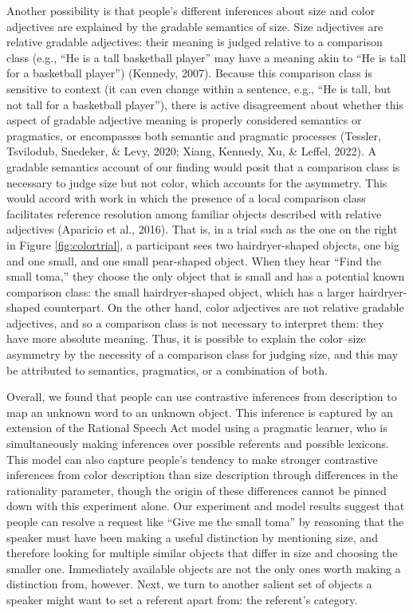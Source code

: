 \documentclass[
  english,
  man,floatsintext]{apa6}
\begin{document}
Another possibility is that people's different inferences about size and color adjectives are explained by the gradable semantics of size. Size adjectives are relative gradable adjectives: their meaning is judged relative to a comparison class (e.g., ``He is a tall basketball player'' may have a meaning akin to ``He is tall for a basketball player'') (Kennedy, 2007). Because this comparison class is sensitive to context (it can even change within a sentence, e.g., ``He is tall, but not tall for a basketball player''), there is active disagreement about whether this aspect of gradable adjective meaning is properly considered semantics or pragmatics, or encompasses both semantic and pragmatic processes (Tessler, Tsvilodub, Snedeker, \& Levy, 2020; Xiang, Kennedy, Xu, \& Leffel, 2022). A gradable semantics account of our finding would posit that a comparison class is necessary to judge size but not color, which accounts for the asymmetry. This would accord with work in which the presence of a local comparison class facilitates reference resolution among familiar objects described with relative adjectives (Aparicio et al., 2016). That is, in a trial such as the one on the right in Figure \ref{fig:colortrial}, a participant sees two hairdryer-shaped objects, one big and one small, and one small pear-shaped object. When they hear ``Find the small toma,'' they choose the only object that is small and has a potential known comparison class: the small hairdryer-shaped object, which has a larger hairdryer-shaped counterpart. On the other hand, color adjectives are not relative gradable adjectives, and so a comparison class is not necessary to interpret them: they have more absolute meaning. Thus, it is possible to explain the color--size asymmetry by the necessity of a comparison class for judging size, and this may be attributed to semantics, pragmatics, or a combination of both.

Overall, we found that people can use contrastive inferences from description to map an unknown word to an unknown object. This inference is captured by an extension of the Rational Speech Act model using a pragmatic learner, who is simultaneously making inferences over possible referents and possible lexicons. This model can also capture people's tendency to make stronger contrastive inferences from color description than size description through differences in the rationality parameter, though the origin of these differences cannot be pinned down with this experiment alone. Our experiment and model results suggest that people can resolve a request like ``Give me the small toma'' by reasoning that the speaker must have been making a useful distinction by mentioning size, and therefore looking for multiple similar objects that differ in size and choosing the smaller one. Immediately available objects are not the only ones worth making a distinction from, however. Next, we turn to another salient set of objects a speaker might want to set a referent apart from: the referent's category.
\end{document}
